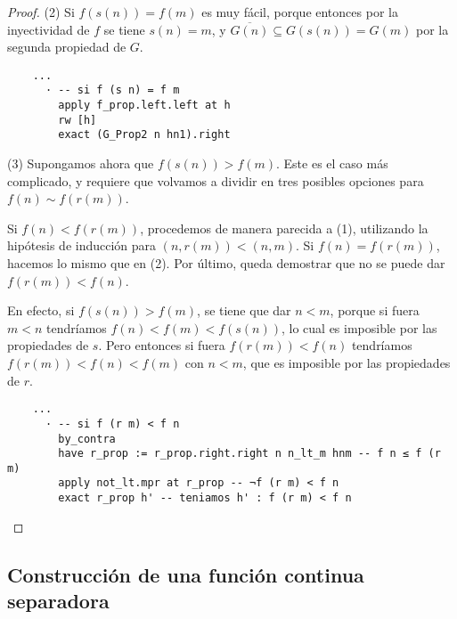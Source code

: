 \begin{proof}
  (2) Si $f(s(n)) = f(m)$ es muy fácil, porque entonces por la inyectividad de $f$ se tiene $s(n)= m$, y $\overline{G(n)} \subseteq G(s(n)) = G(m)$ por la segunda propiedad de $G$.

  \begin{lstlisting}
    ...
      · -- si f (s n) = f m
        apply f_prop.left.left at h
        rw [h]
        exact (G_Prop2 n hn1).right \end{lstlisting}

  (3) Supongamos ahora que $f(s(n))>f(m)$. Este es el caso más complicado, y requiere que volvamos a dividir en tres posibles opciones para $f(n) \sim f(r(m))$.
  
  Si $f(n) < f(r(m))$, procedemos de manera parecida a (1), utilizando la hipótesis de inducción para $(n, r(m)) < (n, m)$. Si $f(n) = f(r(m))$, hacemos lo mismo que en (2). Por último, queda demostrar que no se puede dar $f(r(m)) < f(n)$.

  En efecto, si $f(s(n))>f(m)$, se tiene que dar $n < m$, porque si fuera $m<n$ tendríamos $f(n) < f(m) < f(s(n))$, lo cual es imposible por las propiedades de $s$. Pero entonces si fuera $f(r(m)) < f(n)$ tendríamos $f(r(m)) < f(n) < f(m)$ con $n < m$, que es imposible por las propiedades de $r$.

  \begin{lstlisting}
    ...
      · -- si f (r m) < f n
        by_contra
        have r_prop := r_prop.right.right n n_lt_m hnm -- f n ≤ f (r m)
        apply not_lt.mpr at r_prop -- ¬f (r m) < f n
        exact r_prop h' -- teniamos h' : f (r m) < f n \end{lstlisting}
\end{proof}


\subsection{Construcción de una función continua separadora}







